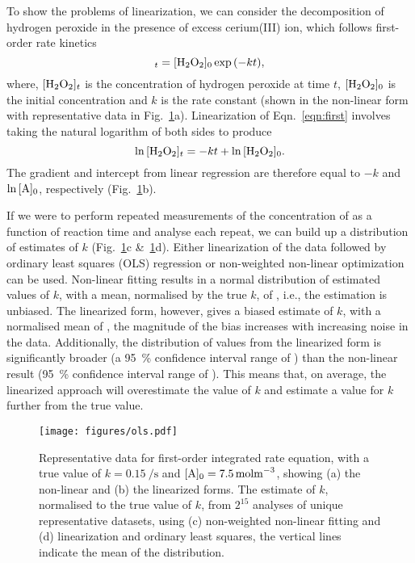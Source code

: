 \documentclass[journal=jceda8,manuscript=article]{achemso}
\begin{document}
To show the problems of linearization, we can consider the decomposition of hydrogen peroxide  in the presence of excess cerium(III) ion, which follows first-order rate kinetics~\cite{monk_math_2010}
%
\begin{equation}
    [\ce{H2O2}]_t = [\ce{H2O2}]_0\exp{(-kt)},
    \label{eqn:first}
\end{equation}
%
where, $[\ce{H2O2}]_t$ is the concentration of hydrogen peroxide at time $t$, $[\ce{H2O2}]_0$ is the initial concentration and $k$ is the rate constant (shown in the non-linear form with representative data in Fig.~\ref{fig:ols}a).
Linearization of Eqn.~\ref{eqn:first} involves taking the natural logarithm of both sides to produce
%
\begin{equation}
    \ln{[\ce{H2O2}]_t} = -kt + \ln{[\ce{H2O2}]_0}.
    \label{eqn:log}
\end{equation}
%
The gradient and intercept from linear regression are therefore equal to $-k$ and $\ln{[\ce{A}]_0}$, respectively (Fig.~\ref{fig:ols}b).

If we were to perform repeated measurements of the concentration of  as a function of reaction time and analyse each repeat, we can build up a distribution of estimates of $k$ (Fig.~\ref{fig:ols}c \&~\ref{fig:ols}d). 
Either linearization of the data followed by ordinary least squares (OLS) regression or non-weighted non-linear optimization can be used. 
Non-linear fitting results in a normal distribution of estimated values of $k$, with a mean, normalised by the true $k$, of , i.e., the estimation is unbiased. 
The linearized form, however, gives a biased estimate of $k$, with a normalised mean of , the magnitude of the bias increases with increasing noise in the data.
Additionally, the distribution of values from the linearized form is significantly broader (a \SI{95}{\percent} confidence interval range of ) than the non-linear result (\SI{95}{\percent} confidence interval range of ).
This means that, on average, the linearized approach will overestimate the value of $k$ and estimate a value for $k$ further from the true value. 
%
\begin{figure}
  \texttt{[image: figures/ols.pdf]}
  \caption{
    Representative data for first-order integrated rate equation, with a true value of $k=\SI{0.15}{\per\second}$ and $[\ce{A}]_0=\SI{7.5}{\mol\m^{-3}}$, showing (a) the non-linear and (b) the linearized forms. 
    The estimate of $k$, normalised to the true value of $k$, from $2^{15}$ analyses of unique representative datasets, using (c) non-weighted non-linear fitting and (d) linearization and ordinary least squares, the vertical lines indicate the mean of the distribution. 
    }
  \label{fig:ols}
\end{figure}
%
\end{document}
